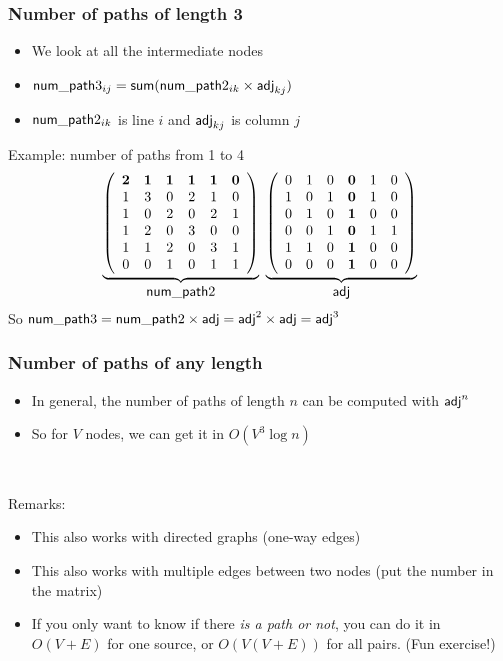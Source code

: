 \documentclass[12pt]{beamer}
\begin{document}
\begin{frame}
\frametitle{Number of paths of length 3}
\begin{itemize}
\item We look at all the intermediate nodes
\item $\mathsf{num\_path}3_{ij} = \textsf{sum}(\mathsf{num\_path}2_{ik} \times \mathsf{adj}_{kj})$
\item $\mathsf{num\_path}2_{ik}$ is line $i$ and $\mathsf{adj}_{kj}$ is column $j$
\end{itemize}

Example: number of paths from 1 to 4
\[
\underbrace{
\left(
\begin{array}{cccccc}
\mathbf{2}&\mathbf{1}&\mathbf{1}&\mathbf{1}&\mathbf{1}&\mathbf{0}\\
1&3&0&2&1&0\\
1&0&2&0&2&1\\
1&2&0&3&0&0\\
1&1&2&0&3&1\\
0&0&1&0&1&1\\
\end{array}
\right)
}_{\mbox{$\mathsf{num\_path}2$}}
\ \underbrace{
\left(
\begin{array}{cccccc}
0&1&0&\mathbf{0}&1&0\\
1&0&1&\mathbf{0}&1&0\\
0&1&0&\mathbf{1}&0&0\\
0&0&1&\mathbf{0}&1&1\\
1&1&0&\mathbf{1}&0&0\\
0&0&0&\mathbf{1}&0&0\\
\end{array}
\right)
}_{\mbox{$\mathsf{adj}$}}
\]
So $\mathsf{num\_path}3 = \mathsf{num\_path}2 \times \mathsf{adj} = \mathsf{adj}^2 \times \mathsf{adj} = \mathsf{adj}^3$
\end{frame}

\begin{frame}
\frametitle{Number of paths of any length}
\begin{itemize}
\item In general, the number of paths of length $n$ can be computed with $\mathsf{adj}^n$
\item So for $V$ nodes, we can get it in $O(V^3 \log n)$
\end{itemize}

~

Remarks:
\begin{itemize}
\item This also works with directed graphs (one-way edges)
\item This also works with multiple edges between two nodes (put the number in the matrix)
\item If you only want to know if there \emph{is a path or not}, you can do it in $O(V+E)$ for one source, or $O(V(V+E))$ for all pairs. (Fun exercise!)
\end{itemize}
\end{frame}
\end{document}
